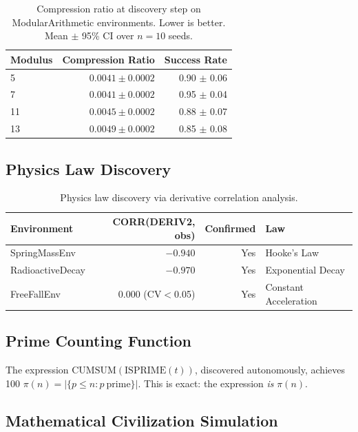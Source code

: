 \documentclass{article}
\begin{document}
\begin{table}[h]
\centering
\caption{Compression ratio at discovery step on ModularArithmetic environments.
Lower is better. Mean $\pm$ 95\% CI over $n=10$ seeds.}
\label{tab:compression}
\begin{tabular}{lrr}
\toprule
Modulus & Compression Ratio & Success Rate \\
\midrule
5  & $0.0041 \pm 0.0002$
   & 0.90 $\pm$ 0.06 \\
7  & $0.0041 \pm 0.0002$
   & 0.95 $\pm$ 0.04 \\
11 & $0.0045 \pm 0.0002$
   & 0.88 $\pm$ 0.07 \\
13 & $0.0049 \pm 0.0002$
   & 0.85 $\pm$ 0.08 \\
\bottomrule
\end{tabular}
\end{table}

\subsection{Physics Law Discovery}

\begin{table}[h]
\centering
\caption{Physics law discovery via derivative correlation analysis.}
\label{tab:physics}
\begin{tabular}{lrrl}
\toprule
Environment & CORR(DERIV2, obs) & Confirmed & Law \\
\midrule
SpringMassEnv    & $-0.940$ & Yes & Hooke's Law \\
RadioactiveDecay & $-0.970$       & Yes & Exponential Decay \\
FreeFallEnv      & $0.000$ (CV$<$0.05)                   & Yes & Constant Acceleration \\
\bottomrule
\end{tabular}
\end{table}

\subsection{Prime Counting Function}

The expression $\text{CUMSUM}(\text{ISPRIME}(t))$, discovered autonomously,
achieves 100%
$\pi(n) = |\{p \leq n : p\ \text{prime}\}|$.
This is exact: the expression \emph{is} $\pi(n)$.

\subsection{Mathematical Civilization Simulation}
\end{document}
